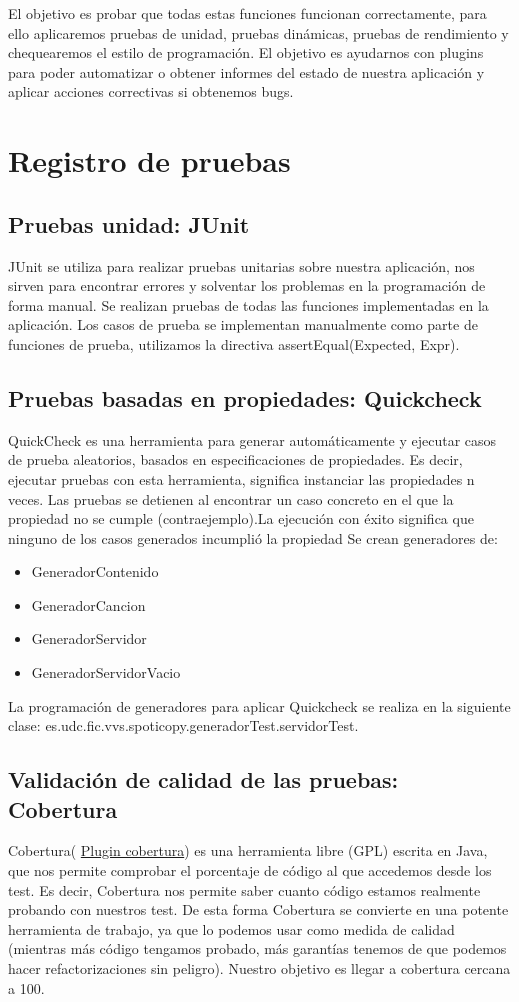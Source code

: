 \documentclass[12pt, a4paper, titlepage]{article}
\begin{document}
	El objetivo es probar que todas estas funciones funcionan correctamente, para ello aplicaremos pruebas de unidad, pruebas dinámicas, pruebas de rendimiento y chequearemos el estilo de programación.
	El objetivo es ayudarnos con plugins para poder automatizar o obtener informes del estado de nuestra aplicación y aplicar acciones correctivas si obtenemos bugs.
	
	\section{Registro de pruebas}
	\subsection{Pruebas unidad: JUnit}
	JUnit se utiliza para realizar pruebas unitarias sobre nuestra aplicación, nos sirven para encontrar errores y solventar los problemas en la programación de forma manual.
	Se realizan pruebas de todas las funciones implementadas en la aplicación.
	Los casos de prueba se implementan manualmente como parte de funciones de prueba, utilizamos la directiva assertEqual(Expected, Expr).
	\subsection{Pruebas basadas en propiedades: Quickcheck}
	QuickCheck es una  herramienta para generar automáticamente y ejecutar casos de prueba aleatorios, basados en especificaciones de propiedades. Es decir, ejecutar pruebas con esta herramienta, significa instanciar las propiedades n veces. Las pruebas se detienen al encontrar un caso concreto en el que la propiedad no se cumple
	(contraejemplo).La ejecución con éxito significa que ninguno de los casos generados incumplió la propiedad
	Se crean generadores de:
	\begin{itemize}
		\item GeneradorContenido
		\item GeneradorCancion
		\item GeneradorServidor
		\item GeneradorServidorVacio
	\end{itemize}
	
	La programación de generadores para aplicar Quickcheck se realiza en la siguiente clase: es.udc.fic.vvs.spoticopy.generadorTest.servidorTest. 
	
	\subsection{Validación de calidad de las pruebas: Cobertura}
	Cobertura( \href{http://cobertura.sourceforge.net/}{Plugin cobertura}) es una herramienta libre (GPL) escrita en Java, que nos permite comprobar el porcentaje de código al que accedemos desde los test. Es decir, Cobertura nos permite saber cuanto código estamos realmente probando con nuestros test.
	De esta forma Cobertura se convierte en una potente herramienta de trabajo, ya que lo podemos usar como medida de calidad (mientras más código tengamos probado, más garantías tenemos de que podemos hacer refactorizaciones sin peligro).
	Nuestro objetivo es llegar a cobertura cercana a 100.
	
\end{document}
